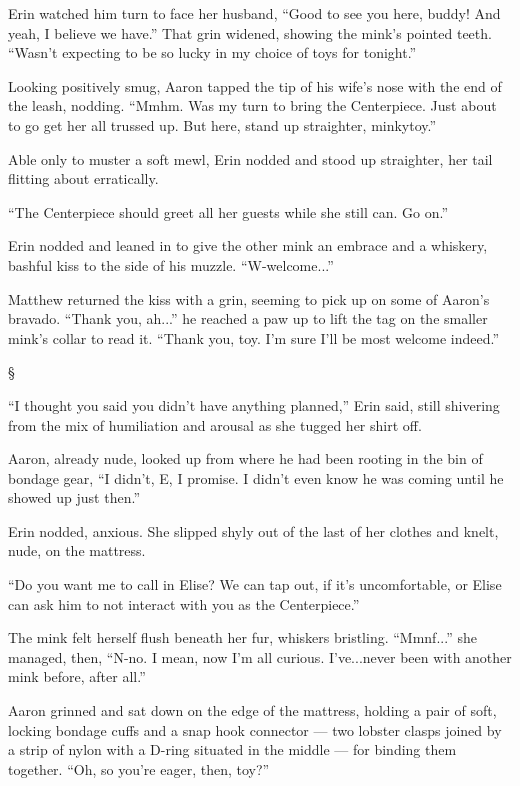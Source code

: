 \documentclass[12pt,letterpaper,oneside]{memoir}
\newcommand\secdiv{
  \begin{center}
    \S
  \end{center}
}
\begin{document}
  Erin watched him turn to face her husband, ``Good to see you here, buddy! And yeah, I believe we have.'' That grin widened, showing the mink's pointed teeth. ``Wasn't expecting to be so lucky in my choice of toys for tonight.''

  Looking positively smug, Aaron tapped the tip of his wife's nose with the end of the leash, nodding. ``Mmhm. Was my turn to bring the Centerpiece. Just about to go get her all trussed up. But here, stand up straighter, minkytoy.''

  Able only to muster a soft mewl, Erin nodded and stood up straighter, her tail flitting about erratically.

  ``The Centerpiece should greet all her guests while she still can. Go on.''

  Erin nodded and leaned in to give the other mink an embrace and a whiskery, bashful kiss to the side of his muzzle. ``W-welcome...''

  Matthew returned the kiss with a grin, seeming to pick up on some of Aaron's bravado. ``Thank you, ah...'' he reached a paw up to lift the tag on the smaller mink's collar to read it. ``Thank you, toy. I'm sure I'll be most welcome indeed.''

  \secdiv

  ``I thought you said you didn't have anything planned,'' Erin said, still shivering from the mix of humiliation and arousal as she tugged her shirt off.

  Aaron, already nude, looked up from where he had been rooting in the bin of bondage gear, ``I didn't, E, I promise. I didn't even know he was coming until he showed up just then.''

  Erin nodded, anxious. She slipped shyly out of the last of her clothes and knelt, nude, on the mattress.

  ``Do you want me to call in Elise? We can tap out, if it's uncomfortable, or Elise can ask him to not interact with you as the Centerpiece.''

  The mink felt herself flush beneath her fur, whiskers bristling. ``Mmnf...'' she managed, then, ``N-no. I mean, now I'm all curious. I've...never been with another mink before, after all.''

  Aaron grinned and sat down on the edge of the mattress, holding a pair of soft, locking bondage cuffs and a snap hook connector --- two lobster clasps joined by a strip of nylon with a D-ring situated in the middle --- for binding them together. ``Oh, so you're eager, then, toy?''
\end{document}
